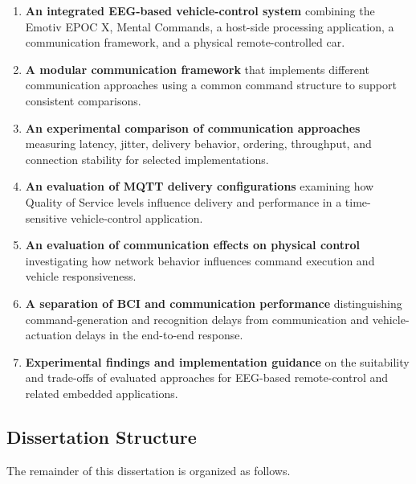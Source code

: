 \begin{enumerate}
  \item \textbf{An integrated EEG-based vehicle-control system} combining the Emotiv EPOC X, Mental Commands, a host-side processing application, a communication framework, and a physical remote-controlled car.
  \item \textbf{A modular communication framework} that implements different communication approaches using a common command structure to support consistent comparisons.
  \item \textbf{An experimental comparison of communication approaches} measuring latency, jitter, delivery behavior, ordering, throughput, and connection stability for selected implementations.
  \item \textbf{An evaluation of MQTT delivery configurations} examining how Quality of Service levels influence delivery and performance in a time-sensitive vehicle-control application.
  \item \textbf{An evaluation of communication effects on physical control} investigating how network behavior influences command execution and vehicle responsiveness.
  \item \textbf{A separation of BCI and communication performance} distinguishing command-generation and recognition delays from communication and vehicle-actuation delays in the end-to-end response.
  \item \textbf{Experimental findings and implementation guidance} on the suitability and trade-offs of evaluated approaches for EEG-based remote-control and related embedded applications.
\end{enumerate}

\subsection{Dissertation Structure}

The remainder of this dissertation is organized as follows.

